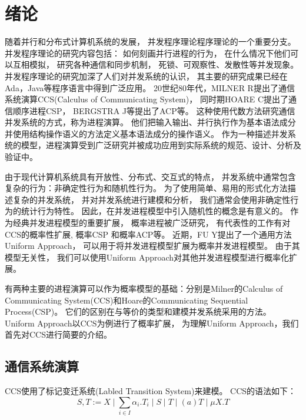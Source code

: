 
\chapter{绪论}\label{ch:intro}

随着并行和分布式计算机系统的发展，
  并发程序理论程序理论的一个重要分支。
  并发程序理论的研究内容包括：
  如何刻画并行进程的行为，
  在什么情况下他们可以互相模拟，
  研究各种通信和同步机制，
  死锁、可观察性、发散性等并发现象。
  并发程序理论的研究加深了人们对并发系统的认识，
  其主要的研究成果已经在Ada，Java等程序语言中得到广泛应用\cite{计算机科学技术百科全书}。
  20世纪80年代，MILNER R提出了通信系统演算CCS(Calculus of Communicating System)\cite{Milner_CCS}，
   同时期HOARE C提出了通信顺序进程CSP\cite{Hoare_CSP}，
   BERGSTRA J等提出了ACP\cite{BERGSTRA_ACP}等。%
   这种使用代数方法研究通信并发系统的方式，称为进程演算。
   他们把输入输出、并行执行作为基本语法成分并使用结构操作语义的方法定义基本语法成分的操作语义。
   作为一种描述并发系统的模型，进程演算受到广泛研究并被成功应用到实际系统的规范、设计、分析及验证中。

由于现代计算机系统具有开放性、分布式、交互式的特点，
并发系统中通常包含复杂的行为：非确定性行为和随机性行为。
为了使用简单、易用的形式化方法描述复杂的并发系统，
并对并发系统进行建模和分析，
我们通常会使用非确定性行为的统计行为特性。
因此，在并发进程模型中引入随机性的概念是有意义的。
作为经典并发进程模型的重要扩展，
概率进程被广泛研究，
有代表性的工作有对CCS的概率性扩展\cite{CCS_Prob_1,CCS_Prob_2},
概率CSP\cite{CSP_Prob} 和概率ACP\cite{ACP_Prob}等。
近期，FU Y提出了一个通用方法Uniform Approach\cite{Fu_UniformApproach}，
可以用于将并发进程模型扩展为概率并发进程模型。
由于其模型无关性，
我们可以使用Uniform Approach对其他并发进程模型进行概率化扩展。

有两种主要的进程演算可以作为概率模型的基础：分别是Milner的Calculus of Communicating System(CCS)和Hoare的Communicating Sequential Process(CSP)。
它们的区别在与等价的类型和建模并发系统采用的方法\cite{DIFF_CCS_CSP}。
Uniform Approach以CCS为例进行了概率扩展，
为理解Uniform Approach，我们首先对CCS进行简要的介绍。

\section{通信系统演算}

   CCS使用了标记变迁系统(Labled Transition System)来建模。
   CCS的语法如下：
   $$S,T:=X\mid \sum_{i\in I}\alpha_i.T_i\mid S\mid T \mid (a)T \mid \mu X.T$$

